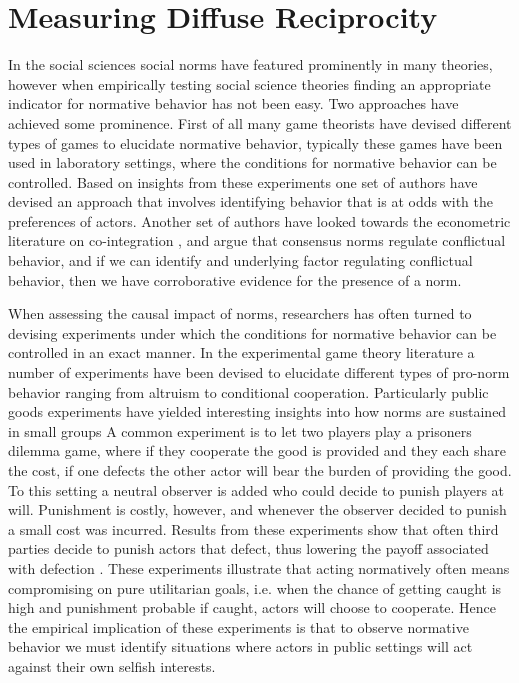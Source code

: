 \section{Measuring Diffuse Reciprocity}

In the social sciences social norms have featured prominently in many theories, however when empirically testing social science theories finding an appropriate indicator for normative behavior has not been easy. Two approaches have achieved some prominence. First of all many game theorists have devised different types of games to elucidate normative behavior, typically these games have been used in laboratory settings, where the conditions for normative behavior can be controlled. Based on insights from these experiments one set of authors have devised an approach that involves identifying behavior that is at odds with the preferences of actors. Another set of authors have looked towards the econometric literature on co-integration \citetext{see \citealt{Beck1992}}, and argue that consensus norms regulate conflictual behavior, and if we can identify and underlying factor regulating conflictual behavior, then we have corroborative evidence for the presence of a norm. 

When assessing the causal impact of norms, researchers has often turned to devising experiments under which the conditions for normative behavior can be controlled in an exact manner. In the experimental game theory literature a number of experiments have been devised to elucidate different types of pro-norm behavior ranging from altruism to conditional cooperation. Particularly public goods experiments have yielded interesting insights into how norms are sustained in small groups A common experiment is to let two players play a prisoners dilemma game, where if they cooperate the good is provided and they each share the cost, if one defects the other actor will bear the burden of providing the good. To this setting a neutral observer is added who could decide to punish players at will. Punishment is costly, however, and whenever the observer decided to punish a small cost was incurred. Results from these experiments show that often third parties decide to punish actors that defect, thus lowering the payoff associated with defection \citetext{see \citealt{FehrFischbacher2004} for an overview}. These experiments illustrate that acting normatively often means compromising on pure utilitarian goals, i.e. when the chance of getting caught is high and punishment probable if caught, actors will choose to cooperate. Hence the empirical implication of these experiments is that to observe normative behavior we must identify situations where actors in public settings will act against their own selfish interests.  

